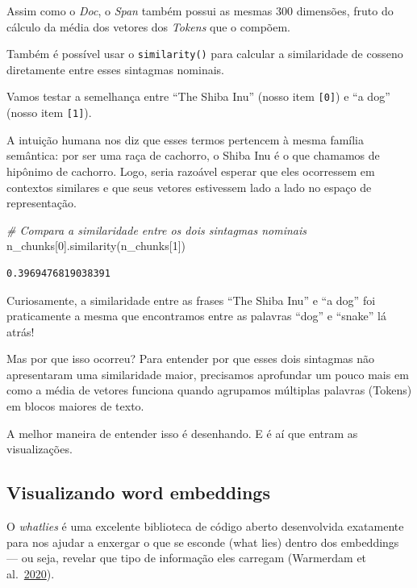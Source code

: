 \documentclass[
  brazilian,
]{article}
\newenvironment{Shaded}{}{}
\newcommand{\CommentTok}[1]{\textcolor[rgb]{0.38,0.63,0.69}{\textit{#1}}}
\newcommand{\DecValTok}[1]{\textcolor[rgb]{0.25,0.63,0.44}{#1}}
\newcommand{\NormalTok}[1]{#1}
\begin{document}
Assim como o \emph{Doc}, o \emph{Span} também possui as mesmas 300
dimensões, fruto do cálculo da média dos vetores dos \emph{Tokens} que o
compõem.

Também é possível usar o \texttt{similarity()} para calcular a
similaridade de cosseno diretamente entre esses sintagmas nominais.

Vamos testar a semelhança entre ``The Shiba Inu'' (nosso item
\texttt{{[}0{]}}) e ``a dog'' (nosso item \texttt{{[}1{]}}).

A intuição humana nos diz que esses termos pertencem à mesma família
semântica: por ser uma raça de cachorro, o Shiba Inu é o que chamamos de
hipônimo de cachorro. Logo, seria razoável esperar que eles ocorressem
em contextos similares e que seus vetores estivessem lado a lado no
espaço de representação.

\begin{Shaded}
\begin{Highlighting}[]
\CommentTok{\# Compara a similaridade entre os dois sintagmas nominais}
\NormalTok{n\_chunks[}\DecValTok{0}\NormalTok{].similarity(n\_chunks[}\DecValTok{1}\NormalTok{])}
\end{Highlighting}
\end{Shaded}

\begin{verbatim}
0.3969476819038391
\end{verbatim}

Curiosamente, a similaridade entre as frases ``The Shiba Inu'' e ``a
dog'' foi praticamente a mesma que encontramos entre as palavras ``dog''
e ``snake'' lá atrás!

Mas por que isso ocorreu? Para entender por que esses dois sintagmas não
apresentaram uma similaridade maior, precisamos aprofundar um pouco mais
em como a média de vetores funciona quando agrupamos múltiplas palavras
(Tokens) em blocos maiores de texto.

A melhor maneira de entender isso é desenhando. E é aí que entram as
visualizações.

\hypertarget{visualizando-word-embeddings}{%
\subsection{Visualizando word
embeddings}\label{visualizando-word-embeddings}}

O \emph{whatlies} é uma excelente biblioteca de código aberto
desenvolvida exatamente para nos ajudar a enxergar o que se esconde
(what lies) dentro dos embeddings --- ou seja, revelar que tipo de
informação eles carregam (Warmerdam et
al.~\href{https://www.aclweb.org/anthology/2020.nlposs-1.8.pdf}{2020}).
\end{document}
